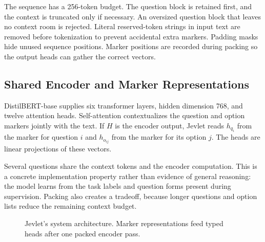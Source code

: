 \documentclass[conference]{IEEEtran}
\begin{document}
The sequence has a 256-token budget. The question block is retained first, and the context is truncated only if necessary. An oversized question block that leaves no context room is rejected. Literal reserved-token strings in input text are removed before tokenization to prevent accidental extra markers. Padding masks hide unused sequence positions. Marker positions are recorded during packing so the output heads can gather the correct vectors.

\subsection{Shared Encoder and Marker Representations}
DistilBERT-base supplies six transformer layers, hidden dimension 768, and twelve attention heads. Self-attention contextualizes the question and option markers jointly with the text. If $H$ is the encoder output, Jevlet reads $h_{q_i}$ from the marker for question $i$ and $h_{o_{ij}}$ from the marker for its option $j$. The heads are linear projections of these vectors.

Several questions share the context tokens and the encoder computation. This is a concrete implementation property rather than evidence of general reasoning: the model learns from the task labels and question forms present during supervision. Packing also creates a tradeoff, because longer questions and option lists reduce the remaining context budget.


\begin{figure}[t]
\centering
{}
\caption{Jevlet's system architecture. Marker representations feed typed heads after one packed encoder pass.}
\label{fig:architecture}
\end{figure}
\end{document}
